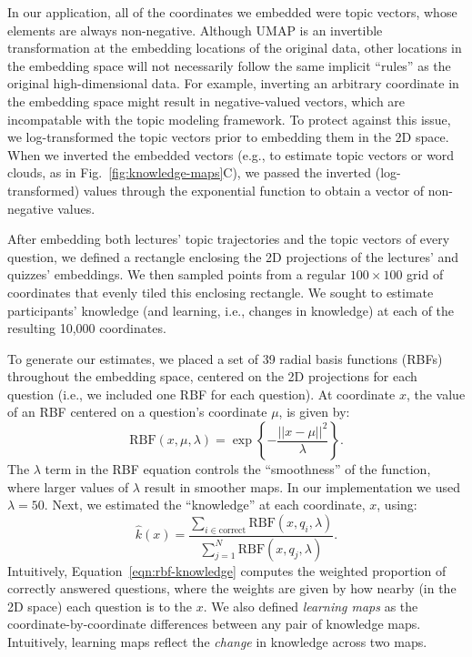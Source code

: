 \documentclass[10pt]{article}
\begin{document}
In our application, all of the coordinates we embedded were topic vectors,
whose elements are always non-negative. Although UMAP is an invertible
transformation at the embedding locations of the original data, other locations
in the embedding space will not necessarily follow the same implicit ``rules''
as the original high-dimensional data. For example, inverting an arbitrary
coordinate in the embedding space might result in negative-valued vectors,
which are incompatable with the topic modeling framework. To protect against
this issue, we log-transformed the topic vectors prior to embedding them in the
2D space. When we inverted the embedded vectors (e.g., to estimate topic
vectors or word clouds, as in Fig.~\ref{fig:knowledge-maps}C), we passed the
inverted (log-transformed) values through the exponential function to obtain a
vector of non-negative values.

After embedding both lectures' topic trajectories and the topic vectors of
every question, we defined a rectangle enclosing the 2D projections of the
lectures' and quizzes' embeddings. We then sampled points from a regular $100
\times 100$ grid of coordinates that evenly tiled this enclosing rectangle. We
sought to estimate participants' knowledge (and learning, i.e., changes in
knowledge) at each of the resulting 10,000 coordinates.

To generate our estimates, we placed a set of 39 radial basis functions (RBFs)
throughout the embedding space, centered on the 2D projections for each
question (i.e., we included one RBF for each question). At coordinate $x$, the
value of an RBF centered on a question's coordinate $\mu$, is given by:
\begin{equation}
    \mathrm{RBF}(x, \mu, \lambda) = \exp\left\{-\frac{||x - \mu||^2}{\lambda}\right\}.
    \label{eqn:rbf}
\end{equation}
The $\lambda$ term in the RBF equation controls the ``smoothness'' of the
function, where larger values of $\lambda$ result in smoother maps. In our
implementation we used $\lambda = 50$.  Next, we estimated the ``knowledge''
at each coordinate, $x$, using:
\begin{equation}
    \hat{k}(x) = \frac{\sum_{i \in \mathrm{correct}} \mathrm{RBF}(x, q_i, \lambda)}{\sum_{j = 1}^N \mathrm{RBF}(x, q_j, \lambda)}.
    \label{eqn:rbf-knowledge}
\end{equation}
Intuitively, Equation~\ref{eqn:rbf-knowledge} computes the weighted proportion of
correctly answered questions, where the weights are given by how nearby (in the 2D space)
each question is to the $x$.  We also defined \textit{learning maps} as the coordinate-by-coordinate
differences between any pair of knowledge maps.  Intuitively, learning maps reflect the \textit{change}
in knowledge across two maps.
\end{document}
